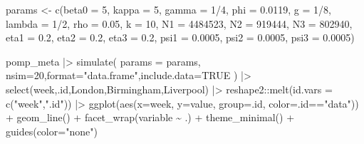 \documentclass[
  letterpaper,
  DIV=11,
  numbers=noendperiod]{scrartcl}
\newenvironment{Shaded}{\begin{snugshade}}{\end{snugshade}}
\newcommand{\AttributeTok}[1]{\textcolor[rgb]{0.40,0.45,0.13}{#1}}
\newcommand{\ConstantTok}[1]{\textcolor[rgb]{0.56,0.35,0.01}{#1}}
\newcommand{\DecValTok}[1]{\textcolor[rgb]{0.68,0.00,0.00}{#1}}
\newcommand{\FloatTok}[1]{\textcolor[rgb]{0.68,0.00,0.00}{#1}}
\newcommand{\FunctionTok}[1]{\textcolor[rgb]{0.28,0.35,0.67}{#1}}
\newcommand{\NormalTok}[1]{\textcolor[rgb]{0.00,0.23,0.31}{#1}}
\newcommand{\OtherTok}[1]{\textcolor[rgb]{0.00,0.23,0.31}{#1}}
\newcommand{\SpecialCharTok}[1]{\textcolor[rgb]{0.37,0.37,0.37}{#1}}
\newcommand{\StringTok}[1]{\textcolor[rgb]{0.13,0.47,0.30}{#1}}
\begin{document}
\framebreak

\begin{Shaded}
\begin{Highlighting}[]
\NormalTok{params }\OtherTok{\textless{}{-}} \FunctionTok{c}\NormalTok{(}\AttributeTok{beta0 =} \DecValTok{5}\NormalTok{, }\AttributeTok{kappa =} \DecValTok{5}\NormalTok{, }\AttributeTok{gamma =} \DecValTok{1}\SpecialCharTok{/}\DecValTok{4}\NormalTok{, }\AttributeTok{phi =} \FloatTok{0.0119}\NormalTok{, }\AttributeTok{g =} \DecValTok{1}\SpecialCharTok{/}\DecValTok{8}\NormalTok{, }
  \AttributeTok{lambda =} \DecValTok{1}\SpecialCharTok{/}\DecValTok{2}\NormalTok{, }\AttributeTok{rho =} \FloatTok{0.05}\NormalTok{, }\AttributeTok{k =} \DecValTok{10}\NormalTok{, }\AttributeTok{N1 =} \DecValTok{4484523}\NormalTok{, }\AttributeTok{N2 =} \DecValTok{919444}\NormalTok{, }
  \AttributeTok{N3 =} \DecValTok{802940}\NormalTok{, }\AttributeTok{eta1 =} \FloatTok{0.2}\NormalTok{, }\AttributeTok{eta2 =} \FloatTok{0.2}\NormalTok{, }\AttributeTok{eta3 =} \FloatTok{0.2}\NormalTok{, }
  \AttributeTok{psi1 =} \FloatTok{0.0005}\NormalTok{, }\AttributeTok{psi2 =} \FloatTok{0.0005}\NormalTok{, }\AttributeTok{psi3 =} \FloatTok{0.0005}\NormalTok{)}

\NormalTok{pomp\_meta }\SpecialCharTok{|\textgreater{}} 
  \FunctionTok{simulate}\NormalTok{(}
    \AttributeTok{params =}\NormalTok{ params, }\AttributeTok{nsim=}\DecValTok{20}\NormalTok{,}\AttributeTok{format=}\StringTok{"data.frame"}\NormalTok{,}\AttributeTok{include.data=}\ConstantTok{TRUE}
\NormalTok{  ) }\SpecialCharTok{|\textgreater{}}
  \FunctionTok{select}\NormalTok{(week,.id,London,Birmingham,Liverpool) }\SpecialCharTok{|\textgreater{}}
\NormalTok{  reshape2}\SpecialCharTok{::}\FunctionTok{melt}\NormalTok{(}\AttributeTok{id.vars =} \FunctionTok{c}\NormalTok{(}\StringTok{"week"}\NormalTok{,}\StringTok{".id"}\NormalTok{)) }\SpecialCharTok{|\textgreater{}}
  \FunctionTok{ggplot}\NormalTok{(}\FunctionTok{aes}\NormalTok{(}\AttributeTok{x=}\NormalTok{week, }\AttributeTok{y=}\NormalTok{value, }\AttributeTok{group=}\NormalTok{.id, }\AttributeTok{color=}\NormalTok{.id}\SpecialCharTok{==}\StringTok{"data"}\NormalTok{)) }\SpecialCharTok{+}
  \FunctionTok{geom\_line}\NormalTok{() }\SpecialCharTok{+} \FunctionTok{facet\_wrap}\NormalTok{(variable }\SpecialCharTok{\textasciitilde{}}\NormalTok{ .) }\SpecialCharTok{+} 
  \FunctionTok{theme\_minimal}\NormalTok{() }\SpecialCharTok{+} \FunctionTok{guides}\NormalTok{(}\AttributeTok{color=}\StringTok{"none"}\NormalTok{)}
\end{Highlighting}
\end{Shaded}
\end{document}
